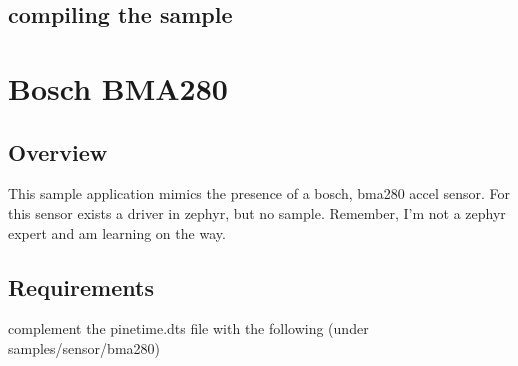 \documentclass[letterpaper,10pt,english]{sphinxmanual}
\begin{document}


\section{compiling the sample}
\label{\detokenize{i2c:compiling-the-sample}}
\begin{sphinxVerbatim}[commandchars=\\\{\}]
      
\end{sphinxVerbatim}


\chapter{Bosch BMA280}
\label{\detokenize{bma280:bosch-bma280}}\label{\detokenize{bma280::doc}}
\begin{sphinxVerbatim}[commandchars=\\\{\}]
\end{sphinxVerbatim}


\section{Overview}
\label{\detokenize{bma280:overview}}
This sample application mimics the presence of a bosch, bma280 accel sensor.
For this sensor exists a driver in zephyr, but no sample.
Remember, I’m not a zephyr expert and am learning on the way.


\section{Requirements}
\label{\detokenize{bma280:requirements}}
complement the pinetime.dts file with the following (under samples/sensor/bma280)

\begin{sphinxVerbatim}[commandchars=\\\{\}]
\end{sphinxVerbatim}
\end{document}
